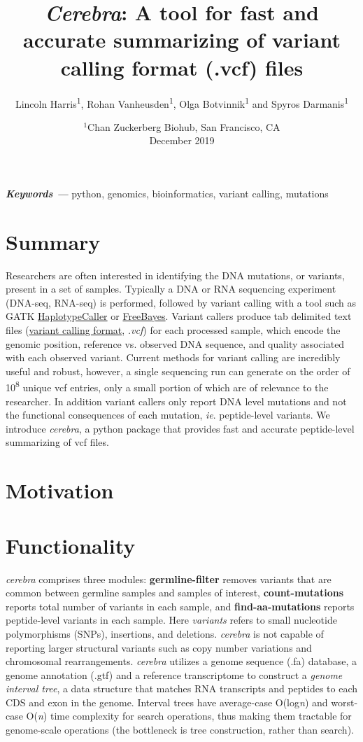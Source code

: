 \documentclass{article}
\title{\emph{Cerebra}: A tool for fast and accurate summarizing of variant calling format (.vcf) files}
\author{Lincoln Harris\textsuperscript{1}, Rohan Vanheusden\textsuperscript{1}, Olga Botvinnik\textsuperscript{1} and Spyros Darmanis\textsuperscript{1}}
\date{%
    $^1$Chan Zuckerberg Biohub, San Francisco, CA\\%
    December 2019}
\providecommand{\keywords}[1]
{
  \small	
  \textbf{\textit{Keywords ---}} #1
}
\begin{document}
\maketitle
\keywords{python, genomics, bioinformatics, variant calling, mutations}

\section*{Summary}
{Researchers are often interested in identifying the DNA mutations, or variants, present in a set of samples. Typically a DNA or RNA sequencing experiment (DNA-seq, RNA-seq) is performed, followed by variant calling with a tool such as GATK \href{https://software.broadinstitute.org/gatk/documentation/tooldocs/3.8-0/org_broadinstitute_gatk_tools_walkers_haplotypecaller_HaplotypeCaller.php}{HaplotypeCaller} or  \href{https://github.com/ekg/freebayes}{FreeBayes}. Variant callers produce tab delimited text files (\href{https://samtools.github.io/hts-specs/VCFv4.2.pdf}{variant calling format}, \emph{.vcf}) for each processed sample, which encode the genomic position, reference vs. observed DNA sequence, and quality associated with each observed variant. Current methods for variant calling are incredibly useful and robust, however, a single sequencing run can generate on the order of 10\textsuperscript{8} unique vcf entries, only a small portion of which are of relevance to the researcher. In addition variant callers only report DNA level mutations and not the functional consequences of each mutation, \emph{ie}. peptide-level variants. We introduce \emph{cerebra}, a python package that provides fast and accurate peptide-level summarizing of vcf files.}

\section*{Motivation}
\section*{Functionality}
{\emph{cerebra} comprises three modules: \textbf{germline-filter} removes variants that are common between germline samples and samples of interest, \textbf{count-mutations} reports total number of variants in each sample, and \textbf{find-aa-mutations} reports peptide-level variants in each sample. Here \emph{variants} refers to small nucleotide polymorphisms (SNPs), insertions, and deletions. \emph{cerebra} is not capable of reporting larger structural variants such as copy number variations and chromosomal rearrangements. \emph{cerebra} utilizes a genome sequence (.fa) database, a genome annotation (.gtf) and a reference transcriptome to construct a \emph{genome interval tree}, a data structure that matches RNA transcripts and peptides to each CDS and exon in the genome. Interval trees have average-case O(log\emph{n}) and worst-case O(\emph{n}) time complexity for search operations, thus making them tractable for genome-scale operations (the bottleneck is tree construction, rather than search).}
\end{document}
